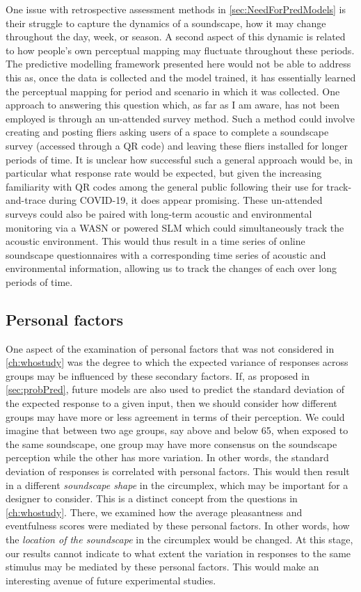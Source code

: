 One issue with retrospective assessment methods in \cref{sec:NeedForPredModels} is their struggle to capture the dynamics of a soundscape, how it may change throughout the day, week, or season. A second aspect of this dynamic is related to how people's own perceptual mapping may fluctuate throughout these periods. The predictive modelling framework presented here would not be able to address this as, once the data is collected and the model trained, it has essentially learned the perceptual mapping for period and scenario in which it was collected. One approach to answering this question which, as far as I am aware, has not been employed is through an un-attended survey method. Such a method could involve creating and posting fliers asking users of a space to complete a soundscape survey (accessed through a QR code) and leaving these fliers installed for longer periods of time. It is unclear how successful such a general approach would be, in particular what response rate would be expected, but given the increasing familiarity with QR codes among the general public following their use for track-and-trace during COVID-19, it does appear promising. These un-attended surveys could also be paired with long-term acoustic and environmental monitoring via a WASN or powered SLM which could simultaneously track the acoustic environment. This would thus result in a time series of online soundscape questionnaires with a corresponding time series of acoustic and environmental information, allowing us to track the changes of each over long periods of time.

\subsection{Personal factors}
One aspect of the examination of personal factors that was not considered in \cref{ch:whostudy} was the degree to which the expected variance of responses across groups may be influenced by these secondary factors. If, as proposed in \cref{sec:probPred}, future models are also used to predict the standard deviation of the expected response to a given input, then we should consider how different groups may have more or less agreement in terms of their perception. We could imagine that between two age groups, say above and below 65, when exposed to the same soundscape, one group may have more consensus on the soundscape perception while the other has more variation. In other words, the standard deviation of responses is correlated with personal factors. This would then result in a different \emph{soundscape shape} in the circumplex, which may be important for a designer to consider. This is a distinct concept from the questions in \cref{ch:whostudy}. There, we examined how the average pleasantness and eventfulness scores were mediated by these personal factors. In other words, how the \emph{location of the soundscape} in the circumplex would be changed. At this stage, our results cannot indicate to what extent the variation in responses to the same stimulus may be mediated by these personal factors. This would make an interesting avenue of future experimental studies.

